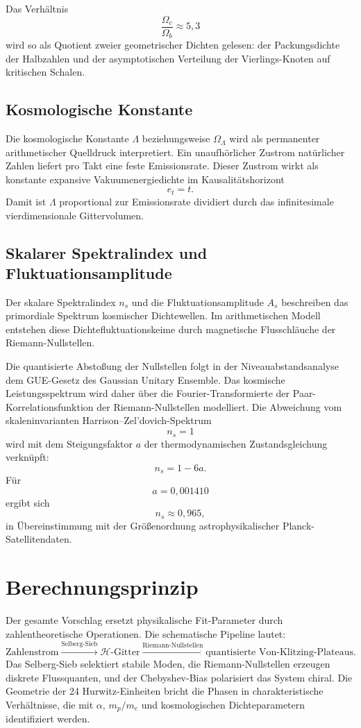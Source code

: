 \documentclass[11pt,a4paper]{article}
\begin{document}
Das Verhältnis
\[
  \frac{\Omega_c}{\Omega_b}\approx 5{,}3
\]
wird so als Quotient zweier geometrischer Dichten gelesen: der Packungsdichte der
Halbzahlen und der asymptotischen Verteilung der Vierlings-Knoten auf kritischen Schalen.

\subsection{Kosmologische Konstante}

Die kosmologische Konstante $\Lambda$ beziehungsweise $\Omega_\Lambda$ wird als permanenter
arithmetischer Quelldruck interpretiert. Ein unaufhörlicher Zustrom natürlicher Zahlen
liefert pro Takt eine feste Emissionsrate. Dieser Zustrom wirkt als konstante expansive
Vakuumenergiedichte im Kausalitätshorizont
\[
  e_t=t.
\]
Damit ist $\Lambda$ proportional zur Emissionsrate dividiert durch das infinitesimale
vierdimensionale Gittervolumen.

\subsection{Skalarer Spektralindex und Fluktuationsamplitude}

Der skalare Spektralindex $n_s$ und die Fluktuationsamplitude $A_s$ beschreiben das
primordiale Spektrum kosmischer Dichtewellen. Im arithmetischen Modell entstehen diese
Dichtefluktuationskeime durch magnetische Flusschläuche der Riemann-Nullstellen.

Die quantisierte Abstoßung der Nullstellen folgt in der Niveauabstandsanalyse dem
GUE-Gesetz des Gaussian Unitary Ensemble. Das kosmische Leistungsspektrum wird daher über
die Fourier-Transformierte der Paar-Korrelationsfunktion der Riemann-Nullstellen modelliert.
Die Abweichung vom skaleninvarianten Harrison--Zel'dovich-Spektrum
\[
  n_s=1
\]
wird mit dem Steigungsfaktor $a$ der thermodynamischen Zustandsgleichung verknüpft:
\[
  n_s = 1-6a.
\]
Für
\[
  a=0{,}001410
\]
ergibt sich
\[
  n_s \approx 0{,}965,
\]
in Übereinstimmung mit der Größenordnung astrophysikalischer Planck-Satellitendaten.

\section{Berechnungsprinzip}

Der gesamte Vorschlag ersetzt physikalische Fit-Parameter durch zahlentheoretische
Operationen. Die schematische Pipeline lautet:
\[
  \text{Zahlenstrom}
  \xrightarrow{\text{Selberg-Sieb}}
  \mathcal{H}\text{-Gitter}
  \xrightarrow{\text{Riemann-Nullstellen}}
  \text{quantisierte Von-Klitzing-Plateaus}.
\]
Das Selberg-Sieb selektiert stabile Moden, die Riemann-Nullstellen erzeugen diskrete
Flussquanten, und der Chebyshev-Bias polarisiert das System chiral. Die Geometrie der
24 Hurwitz-Einheiten bricht die Phasen in charakteristische Verhältnisse, die mit
$\alpha$, $m_p/m_e$ und kosmologischen Dichteparametern identifiziert werden.
\end{document}
